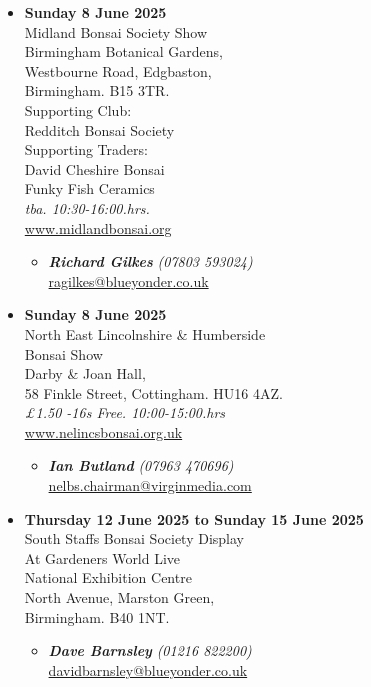 \begin{itemize}
    \item \textbf{Sunday 8 June 2025}
    \\
    Midland Bonsai Society Show \\
    Birmingham Botanical Gardens, \\
    Westbourne Road, Edgbaston, \\
    Birmingham. B15 3TR. \\
    Supporting Club: \\
    Redditch Bonsai Society \\
    Supporting Traders: \\
    David Cheshire Bonsai \\
    Funky Fish Ceramics
    \\
    \emph{tba. 10:30-16:00.hrs.}
    \\
    \href{https://www.midlandbonsai.org}{www.midlandbonsai.org}
    \begin{itemize}
        \item \textbf{\emph{Richard Gilkes}} \emph{(07803 593024)} \\
        \href{mailto:ragilkes@blueyonder.co.uk}{ragilkes@blueyonder.co.uk} 
    \end{itemize}

    \item \textbf{Sunday 8 June 2025}
    \\
    North East Lincolnshire \& Humberside \\
    Bonsai Show \\
    Darby \& Joan Hall, \\
    58 Finkle Street, Cottingham. HU16 4AZ.
    \\
    \emph{£1.50 -16s Free. 10:00-15:00.hrs}
    \\
    \href{http://www.nelincsbonsai.org.uk/}{www.nelincsbonsai.org.uk}
    \begin{itemize}
        \item \textbf{\emph{Ian Butland}} \emph{(07963 470696)} \\
        \href{mailto:nelbs.chairman@virginmedia.com}{nelbs.chairman@virginmedia.com} 
    \end{itemize}

    \item \textbf{Thursday 12 June 2025 to Sunday 15 June 2025}
    \\
    South Staffs Bonsai Society Display \\
    At Gardeners World Live \\
    National Exhibition Centre \\
    North Avenue, Marston Green, \\
    Birmingham. B40 1NT.
    \begin{itemize}
        \item \textbf{\emph{Dave Barnsley}} \emph{(01216 822200)} \\
        \href{mailto:davidbarnsley@blueyonder.co.uk}{davidbarnsley@blueyonder.co.uk} 
    \end{itemize}


\end{itemize}
